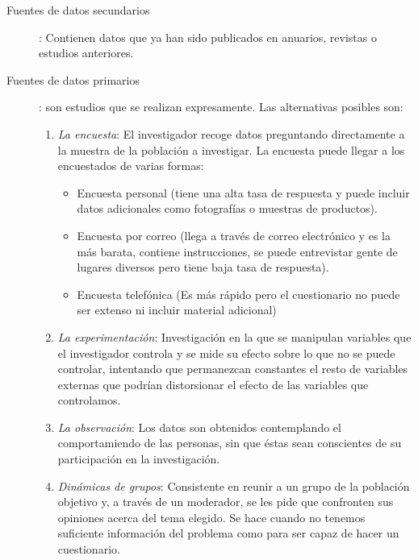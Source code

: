 \documentclass[10pt,a4paper,spanish]{report}
\begin{document}
			\begin{description}
				\item[Fuentes de datos secundarios]: Contienen datos que ya han sido publicados en anuarios, revistas o estudios anteriores.

				\item[Fuentes de datos primarios]: son estudios que se realizan expresamente. Las alternativas posibles son:
				\begin{enumerate}
					\item \textit{\textcolor[rgb]{0.1,0.2,0.4}{La encuesta}}: El investigador recoge datos preguntando directamente a la muestra de la población a investigar. La encuesta puede llegar a los encuestados de varias formas:
					\begin{itemize}
						\item Encuesta personal (tiene una alta tasa de respuesta y puede incluir datos adicionales como fotografías o muestras de productos).
						\item Encuesta por correo (llega a través de correo electrónico y es la más barata, contiene instrucciones, se puede entrevistar gente de lugares diversos pero tiene baja tasa de respuesta).
						\item Encuesta telefónica (Es más rápido pero el cuestionario no puede ser extenso ni incluir material adicional)
					\end{itemize}
					\item \textit{\textcolor[rgb]{0.1,0.2,0.4}{La experimentación}}: Investigación en la que se manipulan variables que el investigador controla y se mide su efecto sobre lo que no se puede controlar, intentando que permanezcan constantes el resto de variables externas que podrían distorsionar el efecto de las variables que controlamos.

					\item \textit{\textcolor[rgb]{0.1,0.2,0.4}{La observación}}: Los datos son obtenidos contemplando el comportamiendo de las personas, sin que éstas sean conscientes de su participación en la investigación.

					\item \textit{\textcolor[rgb]{0.1,0.2,0.4}{Dinámicas de grupos}}: Consistente en reunir a un grupo de la población objetivo y, a través de un moderador, se les pide que confronten sus opiniones acerca del tema elegido. Se hace cuando no tenemos suficiente información del problema como para ser capaz de hacer un cuestionario.
				\end{enumerate}
			\end{description}
\end{document}
